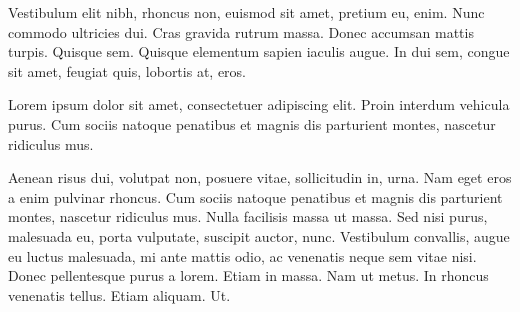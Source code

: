 \begin{center}
\begin{minipage}{.8\textwidth}
\begin{mdframed}
Vestibulum elit nibh, rhoncus non, euismod sit amet, pretium eu, enim. Nunc
commodo ultricies dui. Cras gravida rutrum massa. Donec accumsan mattis turpis.
Quisque sem. Quisque elementum sapien iaculis augue. In dui sem, congue sit
amet, feugiat quis, lobortis at, eros.

Lorem ipsum dolor sit amet, consectetuer adipiscing elit. Proin interdum
vehicula purus. Cum sociis natoque penatibus et magnis dis parturient montes,
nascetur ridiculus mus.

Aenean risus dui, volutpat non, posuere vitae, sollicitudin in, urna. Nam eget
eros a enim pulvinar rhoncus. Cum sociis natoque penatibus et magnis dis
parturient montes, nascetur ridiculus mus. Nulla facilisis massa ut massa. Sed
nisi purus, malesuada eu, porta vulputate, suscipit auctor, nunc. Vestibulum
convallis, augue eu luctus malesuada, mi ante mattis odio, ac venenatis neque
sem vitae nisi. Donec pellentesque purus a lorem. Etiam in massa. Nam ut metus.
In rhoncus venenatis tellus. Etiam aliquam. Ut.


\end{mdframed} \end{minipage} \end{center}

\vspace*{\fill} 
